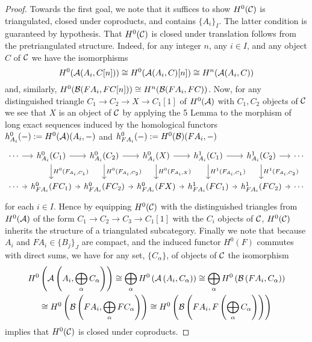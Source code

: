 \begin{proof}
  Towards the first goal, we note that it suffices to show \(H^0(\mathcal{C})\) is triangulated, closed under coproducts, and contains \(\{A_i\}_I\).
  The latter condition is guaranteed by hypothesis.
  That \(H^0(\mathcal{C})\) is closed under translation follows from the pretriangulated structure.  Indeed, for any integer \(n\), any \(i \in I\), and any object \(C\) of \(\mathcal{C}\) we have the isomorphisms
  \[H^0(\mathcal{A}(A_i, C[n])) \cong H^0(\mathcal{A}(A_i, C)[n]) \cong H^n(\mathcal{A}(A_i, C))\]
  and, similarly, \(H^0(\mathcal{B}(FA_i, FC[n])) \cong H^n(\mathcal{B}(FA_i, FC))\).
  Now, for any distinguished triangle \(C_1 \to C_2 \to X \to C_1[1]\) of \(H^0(\mathcal{A})\) with \(C_1, C_2\) objects of \(\mathcal{C}\) we see that \(X\) is an object of \(\mathcal{C}\) by applying the 5 Lemma to the morphism of long exact sequences induced by the homological functors \(h^0_{A_i}(-) := H^0(\mathcal{A})(A_i, -)\) and \(h^0_{FA_i}(-) := H^0(\mathcal{B})(FA_i, -)\)
  \[\begin{tikzcd}[column sep=tiny]
  \cdots \arrow{r} & h^0_{A_i}(C_1) \arrow{r}\arrow{d}{H^0(F_{A_i,C_1})} & h^0_{A_i}(C_2) \arrow{r}\arrow{d}{H^0(F_{A_i,C_2})} & h^0_{A_i}(X) \arrow{r}\arrow{d}{H^0(F_{A_i,X})} & h^1_{A_i}(C_1) \arrow{r}\arrow{d}{H^1(F_{A_i, C_1})} & h^1_{A_i}(C_2) \arrow{r}\arrow{d}{H^1(F_{A_i,C_2})} & \cdots\\
  \cdots \arrow{r} & h^0_{FA_i}(FC_1) \arrow{r} & h^0_{FA_i}(FC_2) \arrow{r} & h^0_{FA_i}(FX) \arrow{r} & h^1_{FA_i}(FC_1) \arrow{r}& h^1_{FA_i}(FC_2)\arrow{r}&\cdots
  \end{tikzcd}\]
  for each \(i \in I\).
  Hence by equipping \(H^0(\mathcal{C})\) with the distinguished triangles from \(H^0(\mathcal{A})\) of the form \(C_1 \to C_2 \to C_3 \to C_1[1]\) with the \(C_i\) objects of \(\mathcal{C}\), \(H^0(\mathcal{C})\) inherits the structure of a triangulated subcategory.
  Finally we note that because \(A_i\) and \(FA_i \in \{B_j\}_J\) are compact, and the induced functor \(H^0(F)\) commutes with direct sums, we have for any set, \(\{C_\alpha\}\), of objects of \(\mathcal{C}\) the isomorphism
  \begin{gather*}
    H^0\left(\mathcal{A}\left(A_i, \bigoplus_\alpha C_\alpha\right)\right) \cong \bigoplus_\alpha H^0\left(\mathcal{A}\left(A_i, C_\alpha\right)\right) \cong \bigoplus_\alpha H^0\left(\mathcal{B}\left(FA_i, C_\alpha\right)\right)\\
    \cong H^0\left(\mathcal{B}\left(FA_i, \bigoplus_\alpha FC_\alpha\right)\right) \cong H^0\left(\mathcal{B}\left(FA_i, F\left(\bigoplus_\alpha C_\alpha\right)\right)\right)
  \end{gather*}
  implies that \(H^0(\mathcal{C})\) is closed under coproducts.


\end{proof}

